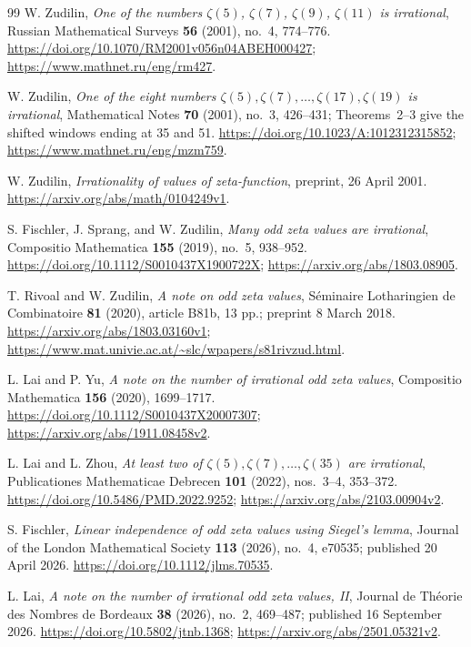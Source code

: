 \documentclass[11pt,letterpaper]{article}
\theoremstyle{definition}
\begin{document}
\begin{thebibliography}{99}
W. Zudilin, \emph{One of the numbers $\zeta(5)$, $\zeta(7)$,
$\zeta(9)$, $\zeta(11)$ is irrational}, Russian Mathematical Surveys
\textbf{56} (2001), no.~4, 774--776.
\url{https://doi.org/10.1070/RM2001v056n04ABEH000427};
\url{https://www.mathnet.ru/eng/rm427}.

W. Zudilin, \emph{One of the eight numbers
$\zeta(5),\zeta(7),\ldots,\zeta(17),\zeta(19)$ is irrational},
Mathematical Notes \textbf{70} (2001), no.~3, 426--431; Theorems~2--3
give the shifted windows ending at 35 and 51.
\url{https://doi.org/10.1023/A:1012312315852};
\url{https://www.mathnet.ru/eng/mzm759}.

W. Zudilin, \emph{Irrationality of values of zeta-function},
preprint, 26 April 2001. \url{https://arxiv.org/abs/math/0104249v1}.

S. Fischler, J. Sprang, and W. Zudilin, \emph{Many odd zeta values are
irrational}, Compositio Mathematica \textbf{155} (2019), no.~5, 938--952.
\url{https://doi.org/10.1112/S0010437X1900722X};
\url{https://arxiv.org/abs/1803.08905}.

T. Rivoal and W. Zudilin, \emph{A note on odd zeta values}, S\'eminaire
Lotharingien de Combinatoire \textbf{81} (2020), article B81b, 13 pp.;
preprint 8 March 2018. \url{https://arxiv.org/abs/1803.03160v1};
\url{https://www.mat.univie.ac.at/~slc/wpapers/s81rivzud.html}.

L. Lai and P. Yu, \emph{A note on the number of irrational odd zeta
values}, Compositio Mathematica \textbf{156} (2020), 1699--1717.
\url{https://doi.org/10.1112/S0010437X20007307};
\url{https://arxiv.org/abs/1911.08458v2}.

L. Lai and L. Zhou, \emph{At least two of
$\zeta(5),\zeta(7),\ldots,\zeta(35)$ are irrational},
Publicationes Mathematicae Debrecen \textbf{101} (2022), nos.~3--4,
353--372. \url{https://doi.org/10.5486/PMD.2022.9252};
\url{https://arxiv.org/abs/2103.00904v2}.

S. Fischler, \emph{Linear independence of odd zeta values using
Siegel's lemma}, Journal of the London Mathematical Society
\textbf{113} (2026), no.~4, e70535; published 20 April 2026.
\url{https://doi.org/10.1112/jlms.70535}.

L. Lai, \emph{A note on the number of irrational odd zeta values, II}, Journal
de Th\'eorie des Nombres de Bordeaux \textbf{38} (2026), no.~2,
469--487; published 16 September 2026.
\url{https://doi.org/10.5802/jtnb.1368};
\url{https://arxiv.org/abs/2501.05321v2}.


\end{thebibliography}
\end{document}
